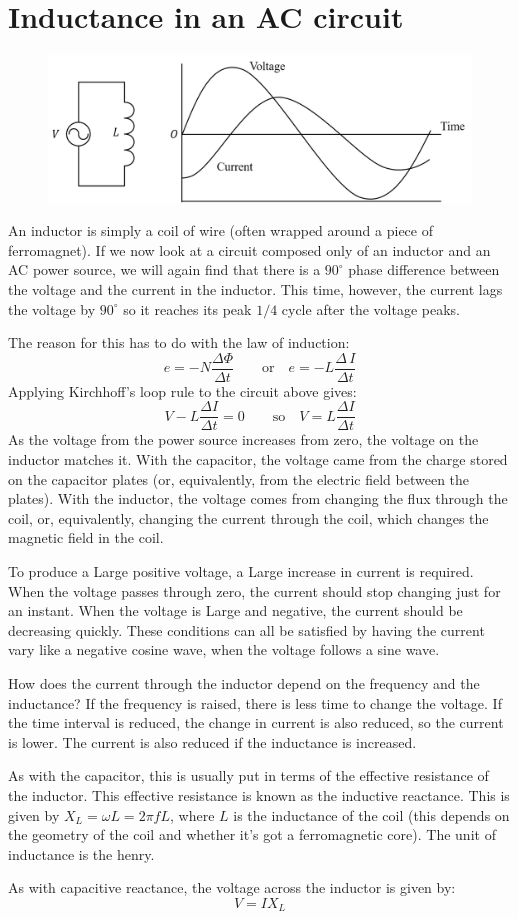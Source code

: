 \documentclass[../main.tex]{subfiles}
\begin{document}
\section{Inductance in an AC circuit}
\begin{figure}[ht]
    \centering
    \includegraphics[scale=.75]{ac-circuit-3.png}
\end{figure}
An inductor is simply a coil of wire (often wrapped around a piece of ferromagnet). If we now look at a circuit composed only of an inductor and an AC power source, we will again find that there is a $ 90^\circ $ phase difference between the voltage and the current in the inductor. This time, however, the current lags the voltage by $ 90^\circ $ so it reaches its peak $ 1/4 $ cycle after the voltage peaks.


The reason for this has to do with the law of induction:
\[
    e =-N\frac{\Delta\Phi}{\Delta t} \qquad\text{or}\quad e =-L\frac{\Delta\,I}{\Delta t}
\]
Applying Kirchhoff's loop rule to the circuit above gives:
\[
    V - L\frac{\Delta I}{\Delta t}= 0 \qquad\text{so}\quad V = L\frac{\Delta I}{\Delta t}
\]
As the voltage from the power source increases from zero, the voltage on the inductor matches it. With the capacitor, the voltage came from the charge stored on the capacitor plates (or, equivalently, from the electric field between the plates). With the inductor, the voltage comes from changing the flux through the coil, or, equivalently, changing the current through the coil, which changes the magnetic field in the coil.

To produce a Large positive voltage, a Large increase in current is required. When the voltage passes through zero, the current should stop changing just for an instant. When the voltage is Large and negative, the current should be decreasing quickly. These conditions can all be satisfied by having the current vary like a negative cosine wave, when the voltage follows a sine wave.


How does the current through the inductor depend on the frequency and the inductance? If the frequency is raised, there is less time to change the voltage. If the time interval is reduced, the change in current is also reduced, so the current is lower. The current is also reduced if the inductance is increased.


As with the capacitor, this is usually put in terms of the effective resistance of the inductor. This effective resistance is known as the inductive reactance. This is given by $ X_L = \omega L = 2\pi fL $, where $ L $ is the inductance of the coil (this depends on the geometry of the coil and whether it's got a ferromagnetic core). The unit of inductance is the henry.


As with capacitive reactance, the voltage across the inductor is given by:
\[ V = IX_L\]
\end{document}
